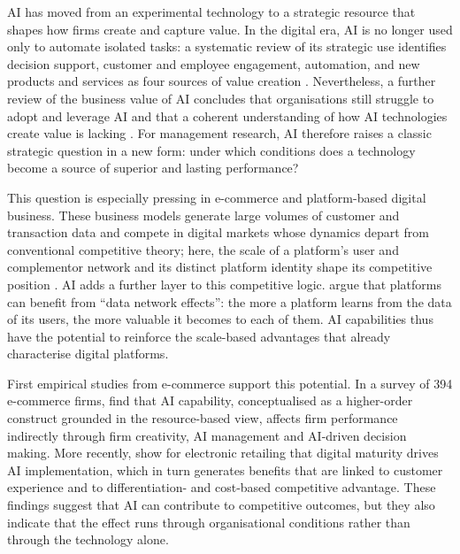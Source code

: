 AI has moved from an experimental technology to a strategic resource that shapes how firms create and capture value. In the digital era, AI is no longer used only to automate isolated tasks: a systematic review of its strategic use identifies decision support, customer and employee engagement, automation, and new products and services as four sources of value creation \parencite[1]{borges2021}. Nevertheless, a further review of the business value of AI concludes that organisations still struggle to adopt and leverage AI and that a coherent understanding of how AI technologies create value is lacking \parencite[1709]{enholm2022}. For management research, AI therefore raises a classic strategic question in a new form: under which conditions does a technology become a source of superior and lasting performance?

This question is especially pressing in e-commerce and platform-based digital business. These business models generate large volumes of customer and transaction data and compete in digital markets whose dynamics depart from conventional competitive theory; here, the scale of a platform's user and complementor network and its distinct platform identity shape its competitive position \parencite[265]{cennamo2021}. AI adds a further layer to this competitive logic. \textcite[534]{gregory2021} argue that platforms can benefit from \enquote{data network effects}: the more a platform learns from the data of its users, the more valuable it becomes to each of them. AI capabilities thus have the potential to reinforce the scale-based advantages that already characterise digital platforms.

First empirical studies from e-commerce support this potential. In a survey of 394 e-commerce firms, \textcite[1]{chen2022} find that AI capability, conceptualised as a higher-order construct grounded in the resource-based view, affects firm performance indirectly through firm creativity, AI management and AI-driven decision making. More recently, \textcite[1]{bunea2026} show for electronic retailing that digital maturity drives AI implementation, which in turn generates benefits that are linked to customer experience and to differentiation- and cost-based competitive advantage. These findings suggest that AI can contribute to competitive outcomes, but they also indicate that the effect runs through organisational conditions rather than through the technology alone.

